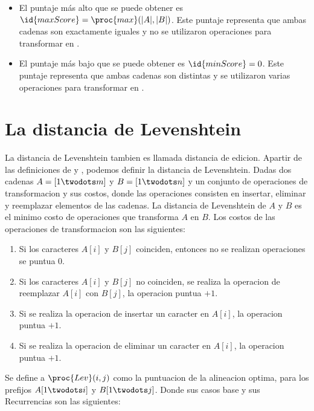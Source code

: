 

\begin{itemize}
  \item El puntaje más alto que se puede obtener es $\id{maxScore} = \proc{max}(|A|,|B|)$. Este puntaje representa que ambas cadenas son exactamente iguales y no se utilizaron operaciones para transformar  en .
  \item El puntaje más bajo que se puede obtener es $\id{minScore} = 0$. Este puntaje representa que ambas cadenas son distintas y se utilizaron varias operaciones para transformar  en .
\end{itemize}

\section{La distancia de Levenshtein}
La distancia de Levenshtein tambien es llamada distancia de edicion. Apartir de las definiciones de \cite{Cormen2009} y \cite{Halim2019}, podemos definir la distancia de Levenshtein. Dadas dos cadenas $A=[1 \twodots m]$ y $B=[1 \twodots n]$ y un conjunto de operaciones de transformacion y sus costos, donde las operaciones consisten en insertar, eliminar y reemplazar elementos de las cadenas. La distancia de Levenshtein de $A$ y $B$ es el minimo costo de operaciones que transforma $A$ en $B$. Los costos de las operaciones de transformacion son las siguientes:
\begin{enumerate}
  \item Si los caracteres $A[i]$ y $B[j]$ coinciden, entonces no se realizan operaciones se puntua $0$.
  \item Si los caracteres $A[i]$ y $B[j]$ no coinciden, se realiza la operacion de reemplazar $A[i]$ con $B[j]$, la operacion puntua $+1$.
  \item Si se realiza la operacion de insertar un caracter en $A[i]$, la operacion puntua $+1$.
  \item Si se realiza la operacion de eliminar un caracter en $A[i]$, la operacion puntua $+1$.
\end{enumerate}

Se define a $\proc{Lev}(i, j)$ como la puntuacion de la alineacion optima, para los prefijos $A[1 \twodots i]$ y $B[1 \twodots j]$. Donde sus casos base y sus Recurrencias son las siguientes:


